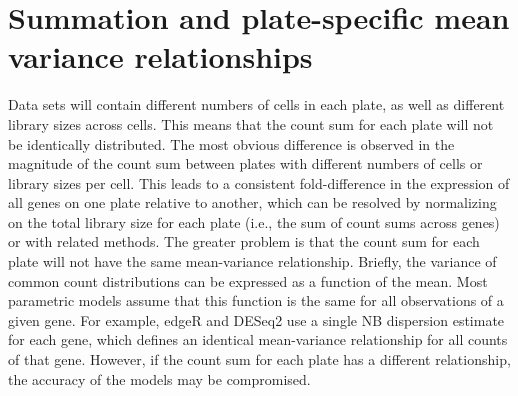 \documentclass{article}
\begin{document}
\section{Summation and plate-specific mean variance relationships}
Data sets will contain different numbers of cells in each plate, as well as different library sizes across cells.
This means that the count sum for each plate will not be identically distributed.
The most obvious difference is observed in the magnitude of the count sum between plates with different numbers of cells or library sizes per cell.
This leads to a consistent fold-difference in the expression of all genes on one plate relative to another, which can be resolved by normalizing on the total library size for each plate (i.e., the sum of count sums across genes) or with related methods.
The greater problem is that the count sum for each plate will not have the same mean-variance relationship.
Briefly, the variance of common count distributions can be expressed as a function of the mean.
Most parametric models assume that this function is the same for all observations of a given gene.
For example, edgeR and DESeq2 use a single NB dispersion estimate for each gene, which defines an identical mean-variance relationship for all counts of that gene.
However, if the count sum for each plate has a different relationship, the accuracy of the models may be compromised.
\end{document}
